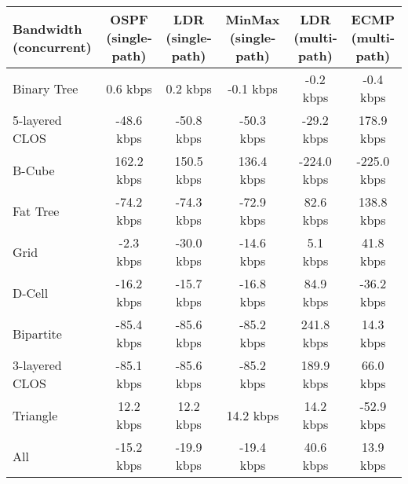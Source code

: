 \begin{tabular}{l|ccccc}
Bandwidth (concurrent) & OSPF (single-path) & LDR (single-path) & MinMax (single-path) & LDR (multi-path) & ECMP (multi-path) \\
\hline
Binary Tree            & 0.6 kbps           & 0.2 kbps          & -0.1 kbps            & -0.2 kbps        & -0.4 kbps         \\
5-layered CLOS         & -48.6 kbps         & -50.8 kbps        & -50.3 kbps           & -29.2 kbps       & 178.9 kbps        \\
B-Cube                 & 162.2 kbps         & 150.5 kbps        & 136.4 kbps           & -224.0 kbps      & -225.0 kbps       \\
Fat Tree               & -74.2 kbps         & -74.3 kbps        & -72.9 kbps           & 82.6 kbps        & 138.8 kbps        \\
Grid                   & -2.3 kbps          & -30.0 kbps        & -14.6 kbps           & 5.1 kbps         & 41.8 kbps         \\
D-Cell                 & -16.2 kbps         & -15.7 kbps        & -16.8 kbps           & 84.9 kbps        & -36.2 kbps        \\
Bipartite              & -85.4 kbps         & -85.6 kbps        & -85.2 kbps           & 241.8 kbps       & 14.3 kbps         \\
3-layered CLOS         & -85.1 kbps         & -85.6 kbps        & -85.2 kbps           & 189.9 kbps       & 66.0 kbps         \\
Triangle               & 12.2 kbps          & 12.2 kbps         & 14.2 kbps            & 14.2 kbps        & -52.9 kbps        \\
All                    & -15.2 kbps         & -19.9 kbps        & -19.4 kbps           & 40.6 kbps        & 13.9 kbps         \\
\end{tabular}